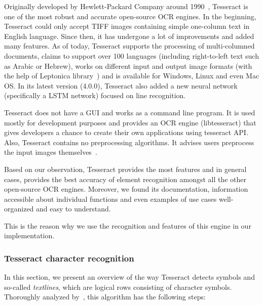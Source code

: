 Originally developed by Hewlett-Packard Company around 1990~\citep{TesseractGIT}, Tesseract is one of the most robust and accurate open-source OCR engines. In the beginning, Tesseract could only accept TIFF images containing simple one-column text in English language. Since then, it has undergone a lot of improvements and added many features. As of today, Tesseract supports the processing of multi-columned documents, claims to support over 100 languages (including right-to-left text such as Arabic or Hebrew), works on different input and output image formats (with the help of Leptonica library~\citep{LeptonicaLIB}) and is available for Windows, Linux and even Mac OS. In its latest version (4.0.0), Tesseract also added a new neural network (specifically a LSTM network) focused on line recognition. 

Tesseract does not have a GUI and works as a command line program. It is used mostly for development purposes and provides an OCR engine (libtesseract) that gives developers a chance to create their own applications using tesseract API. Also, Tesseract contains no preprocessing algorithms. It advises users preprocess the input images themselves~\citep{TesseractQual}.

Based on our observation, Tesseract provides the most features and in general cases, provides the best accuracy of element recognition amongst all the other open-source OCR engines. Moreover, we found its documentation, information accessible about individual functions and even examples of use cases well-organized and easy to understand.

This is the reason why we use the recognition and features of this engine in our implementation.

\subsubsection{Tesseract character recognition} \label{tesseractCharacterRecognition}

In this section, we present an overview of the way Tesseract detects symbols and so-called \emph{textlines}, which are logical rows consisting of character symbols. Thoroughly analyzed by~\citet{smith2007overview}, this algorithm has the following steps:

